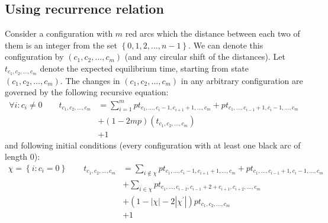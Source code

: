 \documentclass[]{book}
\theoremstyle{definition}
\begin{document}
\subsection{Using recurrence relation}
Consider a configuration with $m$ red arcs which the distance between each two of them is an integer from the set $\left\{ 0,1,2,\hdots,n-1 \right\}$. We can denote this configuration by $\left( c_{1}, c_{2}, \hdots, c_{m} \right)$ (and any circular shift of the distances). Let $t_{c_{1},c_{2},\hdots,c_{m}}$ denote the expected equilibrium time, starting from state $\left( c_{1}, c_{2}, \hdots, c_{m} \right)$. The changes in $\left( c_{1}, c_{2}, \hdots, c_{m} \right)$ in any arbitrary configuration are governed by the following recursive
equation:
\begin{equation}
\begin{split}
    \forall i: c_i \neq 0 \qquad
    t_{c_1, c_2, \hdots, c_m} &= \sum_{i = 1}^{m} pt_{c_1, \hdots, c_{i}-1, c_{i+1}+1, \hdots, c_m} + pt_{c_1, \hdots, c_{i-1}+1, c_{i}-1, \hdots, c_m} \\
    &+ \left(1 - 2mp\right)\left( t_{c_{1}, c_{2}, \hdots, c_{m}} \right) \\
    &+ 1
\end{split}
\end{equation}
and following initial conditions (every configuration with at least one black arc of length 0):
\begin{equation}
\begin{split}
    \chi = \left\{ i:c_i = 0 \right\} \qquad t_{c_1, c_2, \hdots, c_m} &= \sum_{i \notin \chi} pt_{c_1, \hdots, c_{i}-1, c_{i+1}+1, \hdots, c_m} + pt_{c_1, \hdots, c_{i-1}+1, c_{i}-1, \hdots, c_m} \\
    &+ \sum_{i \in \chi} pt_{c_1, \hdots, c_{i-2}, c_{i-1} + 2 + c_{i+1}, c_{i+2}, \hdots, c_m} \\
    &+ \left( 1 - |\chi| - 2|\chi^\prime| \right)pt_{c_1, c_2, \hdots, c_m} \\
    &+ 1
\end{split}
\end{equation}
\end{document}
